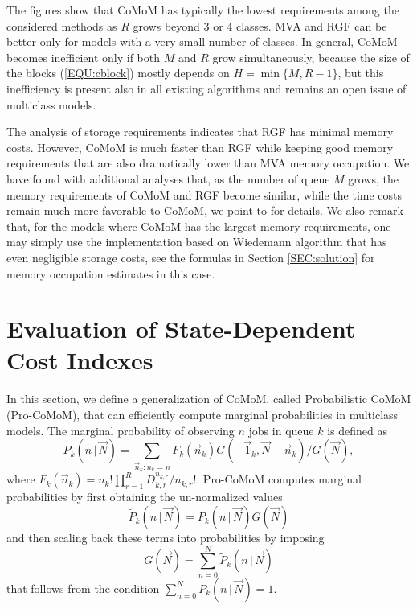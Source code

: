 \documentclass[journal,twocolumn,9.5pt]{IEEEtran}
\newcommand{\comom}[1]{\bar{#1}}
\renewcommand{\Pr}{P}
\begin{document}

The figures show that CoMoM has typically the lowest requirements among the considered methods as $R$ grows beyond $3$ or $4$ classes. MVA and RGF can be better only for models with a very small number of classes. In general, CoMoM becomes inefficient only if both $M$ and $R$ grow simultaneously, because the size of the blocks (\ref{EQU:cblock}) mostly depends on $\comom{H}=\min\{M,R-1\}$, but this inefficiency is present also in all existing algorithms and remains an open issue of multiclass models.

The analysis of storage requirements indicates that RGF has minimal memory costs. However, CoMoM is much faster than RGF while keeping good memory requirements that are also dramatically lower than MVA memory occupation. We have found with additional analyses that, as the number of queue $M$ grows, the memory requirements of CoMoM and RGF become similar, while the time costs remain much more favorable to CoMoM, we point to \cite{TR} for details. We also remark that, for the models where CoMoM has the largest memory requirements, one may simply use the implementation based on Wiedemann algorithm that has even negligible storage costs, see the formulas in Section \ref{SEC:solution} for memory occupation estimates in this case.

\section{Evaluation of State-Dependent Cost Indexes}
\label{SEC:statedepcosts}
In this section, we define a generalization of CoMoM, called Probabilistic CoMoM (Pro-CoMoM), that can efficiently compute marginal probabilities in multiclass models. The marginal probability of observing $n$ jobs in queue $k$ is defined as~\cite{ReiK75b}
\begin{equation}
\textstyle \Pr_k(n\,|\, \vec N)=\sum_{\vec n_k: n_{k}=n} F_k(\vec n_k) {G(-\vec 1_k,\vec N-\vec n_k)}/{G(\vec N)},
\end{equation}
where $F_k(\vec n_k)=n_k!\prod_{r=1}^R {D_{k,r}^{n_{k,r}}}/{n_{k,r}!}$.
Pro-CoMoM computes marginal probabilities by first obtaining the un-normalized values
$$\widetilde{\Pr}_k(n\,|\, \vec N)=\Pr_k(n\,|\, \vec N)G(\vec N)$$ and then scaling back these terms into probabilities by imposing $$\textstyle G(\vec N)=\sum_{n=0}^N\widetilde{\Pr}_k(n\,|\, \vec N)$$ that follows from the condition $\sum_{n=0}^N\Pr_k(n\,|\, \vec N)=1$.
\end{document}
